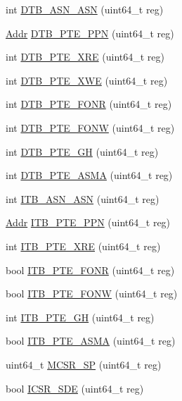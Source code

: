 \begin{DoxyCompactItemize}
int \hyperlink{namespaceAlphaISA_a36b44188d4a889f9397dca5549e44a54}{DTB\_\-ASN\_\-ASN} (uint64\_\-t reg)
\item 
\hyperlink{classm5_1_1params_1_1Addr}{Addr} \hyperlink{namespaceAlphaISA_a0f147507d2a1a5437426ab7231e4a3d5}{DTB\_\-PTE\_\-PPN} (uint64\_\-t reg)
\item 
int \hyperlink{namespaceAlphaISA_a76be4c8ee9a4f1e3f22b6d2b7ac4bfa8}{DTB\_\-PTE\_\-XRE} (uint64\_\-t reg)
\item 
int \hyperlink{namespaceAlphaISA_a310e34dbbc9219cdeb9c877e6d0bd1f7}{DTB\_\-PTE\_\-XWE} (uint64\_\-t reg)
\item 
int \hyperlink{namespaceAlphaISA_a4cba73d4105288236ba519f745492c0b}{DTB\_\-PTE\_\-FONR} (uint64\_\-t reg)
\item 
int \hyperlink{namespaceAlphaISA_a32962f01b9ce7d53ebea64779cb769ba}{DTB\_\-PTE\_\-FONW} (uint64\_\-t reg)
\item 
int \hyperlink{namespaceAlphaISA_a4d5fad955e0b9ccad5b4e7d7820fa01c}{DTB\_\-PTE\_\-GH} (uint64\_\-t reg)
\item 
int \hyperlink{namespaceAlphaISA_a81680a8f0a79643e10fc7337821f5f37}{DTB\_\-PTE\_\-ASMA} (uint64\_\-t reg)
\item 
int \hyperlink{namespaceAlphaISA_aad79c10d320bef0ef127913e19eb2c5d}{ITB\_\-ASN\_\-ASN} (uint64\_\-t reg)
\item 
\hyperlink{classm5_1_1params_1_1Addr}{Addr} \hyperlink{namespaceAlphaISA_a6c2a97078ce2e44d3f04ee016e712c48}{ITB\_\-PTE\_\-PPN} (uint64\_\-t reg)
\item 
int \hyperlink{namespaceAlphaISA_ad24b14426f25156fcab0dfea1992ebff}{ITB\_\-PTE\_\-XRE} (uint64\_\-t reg)
\item 
bool \hyperlink{namespaceAlphaISA_a6fd8f27f8a622d14744aaa0fc16ef7d2}{ITB\_\-PTE\_\-FONR} (uint64\_\-t reg)
\item 
bool \hyperlink{namespaceAlphaISA_aa80ea9dd70abdb33c458d4f99d4b3491}{ITB\_\-PTE\_\-FONW} (uint64\_\-t reg)
\item 
int \hyperlink{namespaceAlphaISA_a9640ea9e1d42b4e0f47250c7efe687f9}{ITB\_\-PTE\_\-GH} (uint64\_\-t reg)
\item 
bool \hyperlink{namespaceAlphaISA_a198dd6b2a31db4d72de90c9e4d02d9fc}{ITB\_\-PTE\_\-ASMA} (uint64\_\-t reg)
\item 
uint64\_\-t \hyperlink{namespaceAlphaISA_a1d43dec6cc4c104201ca82a0b2a28d56}{MCSR\_\-SP} (uint64\_\-t reg)
\item 
bool \hyperlink{namespaceAlphaISA_a77a0dc059f8e677358c55c3c206ea78b}{ICSR\_\-SDE} (uint64\_\-t reg)

\end{DoxyCompactItemize}

